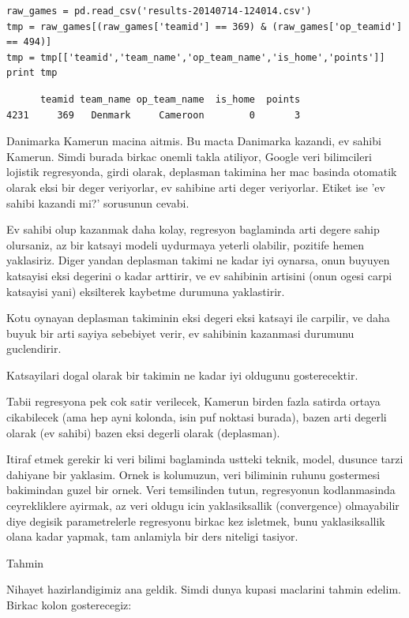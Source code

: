 \documentclass[12pt,fleqn]{article}\usepackage{../common}
\begin{document}
\begin{verbatim}
raw_games = pd.read_csv('results-20140714-124014.csv')
tmp = raw_games[(raw_games['teamid'] == 369) & (raw_games['op_teamid'] == 494)]
tmp = tmp[['teamid','team_name','op_team_name','is_home','points']]
print tmp
\end{verbatim}

\begin{verbatim}
      teamid team_name op_team_name  is_home  points
4231     369   Denmark     Cameroon        0       3
\end{verbatim}

Danimarka Kamerun macina aitmis. Bu macta Danimarka kazandi, ev sahibi
Kamerun. Simdi burada birkac onemli takla atiliyor, Google veri bilimcileri
lojistik regresyonda, girdi olarak, deplasman takimina her mac basinda
otomatik olarak eksi bir deger veriyorlar, ev sahibine arti deger
veriyorlar. Etiket ise 'ev sahibi kazandi mi?' sorusunun cevabi.

Ev sahibi olup kazanmak daha kolay, regresyon baglaminda arti degere sahip
olursaniz, az bir katsayi modeli uydurmaya yeterli olabilir, pozitife hemen
yaklasiriz. Diger yandan deplasman takimi ne kadar iyi oynarsa, onun buyuyen
katsayisi eksi degerini o kadar arttirir, ve ev sahibinin artisini (onun
ogesi carpi katsayisi yani) eksilterek kaybetme durumuna yaklastirir.

Kotu oynayan deplasman takiminin eksi degeri eksi katsayi ile carpilir, ve
daha buyuk bir arti sayiya sebebiyet verir, ev sahibinin kazanmasi durumunu
guclendirir. 

Katsayilari dogal olarak bir takimin ne kadar iyi oldugunu gosterecektir. 

Tabii regresyona pek cok satir verilecek, Kamerun birden fazla satirda
ortaya cikabilecek (ama hep ayni kolonda, isin puf noktasi burada), bazen
arti degerli olarak (ev sahibi) bazen eksi degerli olarak (deplasman).

Itiraf etmek gerekir ki veri bilimi baglaminda ustteki teknik, model,
dusunce tarzi dahiyane bir yaklasim. Ornek is kolumuzun, veri biliminin
ruhunu gostermesi bakimindan guzel bir ornek. Veri temsilinden tutun,
regresyonun kodlanmasinda ceyrekliklere ayirmak, az veri oldugu icin
yaklasiksallik (convergence) olmayabilir diye degisik parametrelerle
regresyonu birkac kez isletmek, bunu yaklasiksallik olana kadar yapmak, tam
anlamiyla bir ders niteligi tasiyor. 

Tahmin

Nihayet hazirlandigimiz ana geldik. Simdi dunya kupasi maclarini tahmin
edelim. Birkac kolon gosterecegiz:
\end{document}
